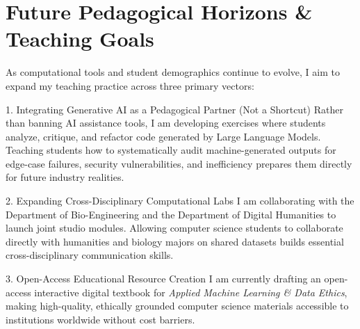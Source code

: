 \documentclass[11pt,a4paper]{article}
\begin{document}
\vspace{6pt}

\section{Future Pedagogical Horizons \& Teaching Goals}

As computational tools and student demographics continue to evolve, I aim to expand my teaching practice across three primary vectors:

\begin{calloutbox}{1. Integrating Generative AI as a Pedagogical Partner (Not a Shortcut)}
  Rather than banning AI assistance tools, I am developing exercises where students analyze, critique, and refactor code generated by Large Language Models. Teaching students how to systematically audit machine-generated outputs for edge-case failures, security vulnerabilities, and inefficiency prepares them directly for future industry realities.
\end{calloutbox}

\vspace{4pt}

\begin{calloutbox}{2. Expanding Cross-Disciplinary Computational Labs}
  I am collaborating with the Department of Bio-Engineering and the Department of Digital Humanities to launch joint studio modules. Allowing computer science students to collaborate directly with humanities and biology majors on shared datasets builds essential cross-disciplinary communication skills.
\end{calloutbox}

\vspace{4pt}

\begin{calloutbox}{3. Open-Access Educational Resource Creation}
  I am currently drafting an open-access interactive digital textbook for \textit{Applied Machine Learning \& Data Ethics}, making high-quality, ethically grounded computer science materials accessible to institutions worldwide without cost barriers.
\end{calloutbox}
\end{document}
